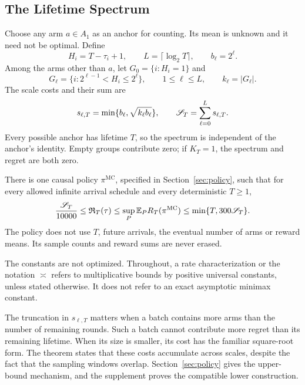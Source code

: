 \subsection{The Lifetime Spectrum}
Choose any arm $a\in A_1$ as an anchor for counting. Its mean is unknown and it need not be optimal. Define
\[
 H_i=T-\tau_i+1,\qquad L=\lceil\log_2T\rceil,\qquad b_\ell=2^\ell.
\]
Among the arms other than $a$, let $G_0=\{i:H_i=1\}$ and
\[
 G_\ell=\{i:2^{\ell-1}<H_i\le2^\ell\},\qquad 1\le\ell\le L,
 \qquad k_\ell=|G_\ell|.
\]
The scale costs and their sum are
\begin{equation}\label{eq:spectrum}
 s_{\ell,T}=\min\{b_\ell,\sqrt{k_\ell b_\ell}\},\qquad
 \mathscr S_T=\sum_{\ell=0}^{L}s_{\ell,T}.
\end{equation}
Every possible anchor has lifetime $T$, so the spectrum is independent of the anchor's identity. Empty groups contribute zero; if $K_T=1$, the spectrum and regret are both zero.

\begin{theorem}\label{thm:main}
There is one causal policy $\pi^{\mathrm{MC}}$, specified in Section~\ref{sec:policy}, such that for every allowed infinite arrival schedule and every deterministic $T\ge1$,
\begin{equation}\label{eq:main}
 \frac{\mathscr S_T}{10000}\le\mathfrak R_T(\tau)
 \le\sup_P\mathbb E_P R_T(\pi^{\mathrm{MC}})
 \le\min\{T,300\mathscr S_T\}.
\end{equation}
The policy does not use $T$, future arrivals, the eventual number of arms or reward means. Its sample counts and reward sums are never erased.
\end{theorem}

The constants are not optimized. Throughout, a rate characterization or the notation $\asymp$ refers to multiplicative bounds by positive universal constants, unless stated otherwise. It does not refer to an exact asymptotic minimax constant.

The truncation in $s_{\ell,T}$ matters when a batch contains more arms than the number of remaining rounds. Such a batch cannot contribute more regret than its remaining lifetime. When its size is smaller, its cost has the familiar square-root form. The theorem states that these costs accumulate across scales, despite the fact that the sampling windows overlap. Section~\ref{sec:policy} gives the upper-bound mechanism, and the supplement proves the compatible lower construction.


